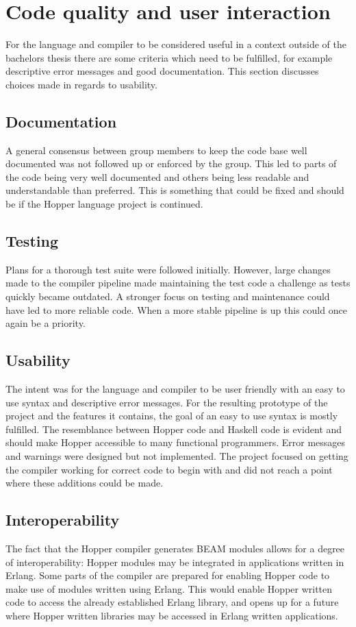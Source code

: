 \section{Code quality and user interaction}

For the language and compiler to be considered useful in a context outside of the bachelors thesis there are some criteria which need to be fulfilled, for example descriptive error messages and good documentation.
This section discusses choices made in regards to usability.

\subsection{Documentation}

A general consensus between group members to keep the code base well documented was not followed up or enforced by the group. This led to parts of the code being very well documented and others being less readable and understandable than preferred. This is something that could be fixed and should be if the Hopper language project is continued.

\subsection{Testing}

Plans for a thorough test suite were followed initially. However, large changes made to the compiler pipeline made maintaining the test code a challenge as tests quickly became outdated. A stronger focus on testing and maintenance could have led to more reliable code. When a more stable pipeline is up this could once again be a priority.

\subsection{Usability}

The intent was for the language and compiler to be user friendly with an easy to use syntax and descriptive error messages.
For the resulting prototype of the project and the features it contains, the goal of an easy to use syntax is mostly fulfilled. The resemblance between Hopper code and Haskell code is evident and should make Hopper accessible to many functional programmers. %
Error messages and warnings were designed but not implemented. The project focused on getting the compiler working for correct code to begin with and did not reach a point where these additions could be made.

\subsection{Interoperability}

The fact that the Hopper compiler generates BEAM modules allows for a degree of interoperability: Hopper modules may be integrated in applications written in Erlang. Some parts of the compiler are prepared for enabling Hopper code to make use of modules written using Erlang. This would enable Hopper written code to access the already established Erlang library, and opens up for a future where Hopper written libraries may be accessed in Erlang written applications.
